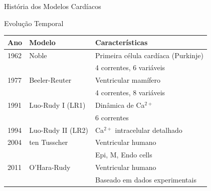 \begin{frame}{História dos Modelos Cardíacos}
\begin{block}{Evolução Temporal}
\begin{center}
\begin{tabular}{lll}
\toprule
\textbf{Ano} & \textbf{Modelo} & \textbf{Características} \\
\midrule
1962 & Noble & Primeira célula cardíaca (Purkinje) \\
     &       & 4 correntes, 6 variáveis \\
\midrule
1977 & Beeler-Reuter & Ventricular mamífero \\
     &               & 4 correntes, 8 variáveis \\
\midrule
1991 & Luo-Rudy I (LR1) & Dinâmica de Ca$^{2+}$ \\
     &                   & 6 correntes \\
\midrule
1994 & Luo-Rudy II (LR2) & Ca$^{2+}$ intracelular detalhado \\
\midrule
2004 & ten Tusscher & Ventricular humano \\
     &              & Epi, M, Endo cells \\
\midrule
2011 & O'Hara-Rudy & Ventricular humano \\
     &             & Baseado em dados experimentais \\
\bottomrule
\end{tabular}
\end{center}
\end{block}

\end{frame}

